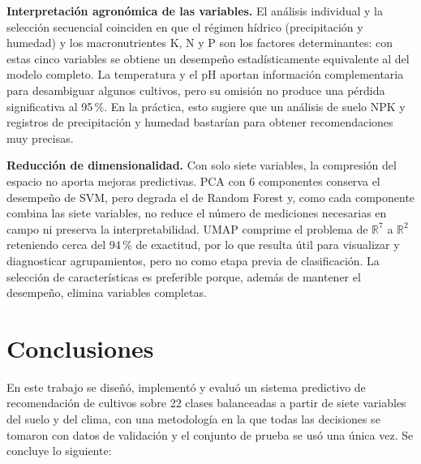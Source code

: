 \documentclass[conference]{IEEEtran}
\begin{document}
\textbf{Interpretación agronómica de las variables.} El análisis individual y la selección secuencial coinciden en que el régimen hídrico (precipitación y humedad) y los macronutrientes K, N y P son los factores determinantes: con estas cinco variables se obtiene un desempeño estadísticamente equivalente al del modelo completo. La temperatura y el pH aportan información complementaria para desambiguar algunos cultivos, pero su omisión no produce una pérdida significativa al 95\,\%. En la práctica, esto sugiere que un análisis de suelo NPK y registros de precipitación y humedad bastarían para obtener recomendaciones muy precisas.

\textbf{Reducción de dimensionalidad.} Con solo siete variables, la compresión del espacio no aporta mejoras predictivas. PCA con 6 componentes conserva el desempeño de SVM, pero degrada el de Random Forest y, como cada componente combina las siete variables, no reduce el número de mediciones necesarias en campo ni preserva la interpretabilidad. UMAP comprime el problema de $\mathbb{R}^7$ a $\mathbb{R}^2$ reteniendo cerca del 94\,\% de exactitud, por lo que resulta útil para visualizar y diagnosticar agrupamientos, pero no como etapa previa de clasificación. La selección de características es preferible porque, además de mantener el desempeño, elimina variables completas.

\section{Conclusiones}
\label{sec:conclusiones}

En este trabajo se diseñó, implementó y evaluó un sistema predictivo de recomendación de cultivos sobre 22 clases balanceadas a partir de siete variables del suelo y del clima, con una metodología en la que todas las decisiones se tomaron con datos de validación y el conjunto de prueba se usó una única vez. Se concluye lo siguiente:
\end{document}
